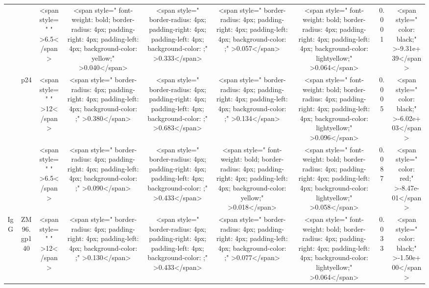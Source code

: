 \begin{tabular}{c|c|c|c|c|c|c|c|c}
\cline{3-9}
 &  & <span style="     " >6.5</span> & <span style=" font-weight: bold;    border-radius: 4px; padding-right: 4px; padding-left: 4px; background-color: yellow;" >0.040</span> & <span style="     border-radius: 4px; padding-right: 4px; padding-left: 4px; background-color: ;" >0.333</span> & <span style="     border-radius: 4px; padding-right: 4px; padding-left: 4px; background-color: ;" >0.057</span> & <span style=" font-weight: bold;    border-radius: 4px; padding-right: 4px; padding-left: 4px; background-color: lightyellow;" >0.064</span> & 0.001 & <span style="     color: black;" >-9.31e+39</span>\\
\cline{3-9}
 & \multirow{-3}{*}{\centering\arraybackslash p24} & <span style="     " >12</span> & <span style="     border-radius: 4px; padding-right: 4px; padding-left: 4px; background-color: ;" >0.380</span> & <span style="     border-radius: 4px; padding-right: 4px; padding-left: 4px; background-color: ;" >0.683</span> & <span style="     border-radius: 4px; padding-right: 4px; padding-left: 4px; background-color: ;" >0.134</span> & <span style=" font-weight: bold;    border-radius: 4px; padding-right: 4px; padding-left: 4px; background-color: lightyellow;" >0.096</span> & 0.005 & <span style="     color: black;" >-6.02e+03</span>\\
\cline{2-9}
 &  & <span style="     " >6.5</span> & <span style="     border-radius: 4px; padding-right: 4px; padding-left: 4px; background-color: ;" >0.090</span> & <span style="     border-radius: 4px; padding-right: 4px; padding-left: 4px; background-color: ;" >0.433</span> & <span style=" font-weight: bold;    border-radius: 4px; padding-right: 4px; padding-left: 4px; background-color: yellow;" >0.018</span> & <span style=" font-weight: bold;    border-radius: 4px; padding-right: 4px; padding-left: 4px; background-color: lightyellow;" >0.058</span> & 0.087 & <span style="     color: red;" >-8.47e-01</span>\\
\cline{3-9}
\multirow{-12}{*}{\centering\arraybackslash IgG} & \multirow{-2}{*}{\centering\arraybackslash ZM96.gp140} & <span style="     " >12</span> & <span style="     border-radius: 4px; padding-right: 4px; padding-left: 4px; background-color: ;" >0.130</span> & <span style="     border-radius: 4px; padding-right: 4px; padding-left: 4px; background-color: ;" >0.433</span> & <span style="     border-radius: 4px; padding-right: 4px; padding-left: 4px; background-color: ;" >0.077</span> & <span style=" font-weight: bold;    border-radius: 4px; padding-right: 4px; padding-left: 4px; background-color: lightyellow;" >0.064</span> & 0.033 & <span style="     color: black;" >-1.50e+00</span>\\
\hline
\end{tabular}